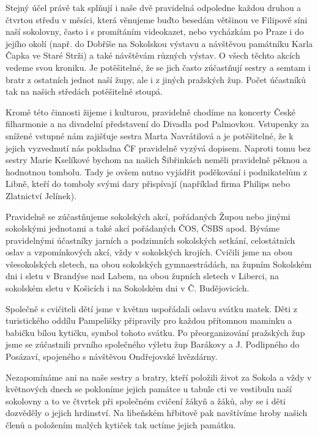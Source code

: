 Stejný účel právě tak splňují i naše dvě pravidelná odpoledne každou
druhou a čtvrtou středu v měsíci, která věnujeme buďto besedám většinou
ve Filipově síni naší sokolovny, často i s promítáním videokazet, nebo
vycházkám po Praze i do jejího okolí (např. do Dobříše na Sokolskou
výstavu a návštěvou památníku Karla Čapka ve Staré Strži) a také
návštěvám různých výstav. O všech těchto akcích vedeme svou kroniku. Je
potěšitelné, že se jich často zúčastňují sestry a semtam i bratr z
ostatních jednot naší župy, ale i z jiných pražských žup. Počet
účastníků tak na našich středách potěšitelně stoupá.

Kromě této činnosti žijeme i kulturou, pravidelně chodíme na koncerty
České filharmonie a na divadelní představení do Divadla pod Palmovkou.
Vstupenky za snížené vstupné nám zajišťuje sestra Marta Navrátilová a je
potěšitelné, že k jejich vyzvednutí nás pokladna ČF pravidelně vyzývá
dopisem. Naproti tomu bez sestry Marie Kselíkové bychom na našich
Šibřinkách neměli pravidelně pěknou a hodnotnou tombolu. Tady je ovšem
nutno vyjádřit poděkování i podnikatelům z Libně, kteří do tomboly svými
dary přispívají (například firma Philips nebo Zlatnictví Jelínek).

Pravidelně se zúčastňujeme sokolských akcí, pořádaných Župou nebo jinými
sokolskými jednotami a také akcí pořádaných ČOS, ČSBS apod. Býváme
pravidelnými účastníky jarních a podzimních sokolských setkání,
celostátních oslav a vzpomínkových akcí, vždy v sokolských krojích.
Cvičili jsme na obou všesokolských sletech, na obou sokolských
gymnaestrádách, na župním Sokolském dni i sletu v Brandýse nad Labem, na
obou župních sletech v Liberci, na sokolském sletu v Košicích i na
Sokolském dni v Č. Budějovicích.

Společně s cvičiteli dětí jsme v květnu uspořádali oslavu svátku matek.
Děti z turistického oddílu Pampelišky připravily pro každou přítomnou
maminku a babičku bílou kytičku, symbol tohoto svátku. Po
přeorganizování pražských žup jsme se zúčastnili prvního společného
výletu žup Barákovy a J. Podlipného do Posázaví, spojeného s návštěvou
Ondřejovské hvězdárny.

Nezapomínáme ani na naše sestry a bratry, kteří položili život za Sokola
a vždy v květnových dnech se pokloníme jejich památce u tabule cti ve
vestibulu naší sokolovny a to ve čtvrtek při společném cvičení žákyň a
žáků, aby se i děti dozvěděly o jejich hrdinství. Na libeňském hřbitově
pak navštívíme hroby našich členů a položením malých kytiček tak uctíme
jejich památku.

